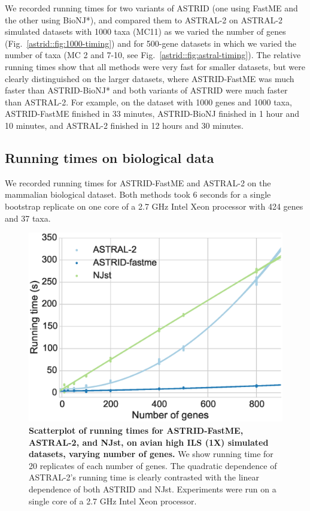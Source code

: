We recorded running times for two variants of ASTRID
(one using FastME and the other using BioNJ*), and compared them
to ASTRAL-2 on ASTRAL-2 simulated datasets  with
1000 taxa (MC11) as we varied the number of genes
(Fig.~\ref{astrid::fig:1000-timing}) and for 500-gene datasets
in which we varied the number of taxa (MC 2 and 7-10, see Fig.~\ref{astrid::fig:astral-timing}).
The relative running times show that all methods were
very fast for smaller datasets, but were clearly distinguished
on the larger datasets, where 
ASTRID-FastME was much faster than ASTRID-BioNJ* and 
both variants of 
ASTRID were much faster than ASTRAL-2.  
For example, on the dataset with 1000
genes and 1000 taxa, ASTRID-FastME
finished in 33 minutes, ASTRID-BioNJ finished in 1 hour and 10
minutes, and ASTRAL-2 finished in 12 hours and 30 minutes.


\subsection{Running times on biological data}
We recorded running times for ASTRID-FastME and ASTRAL-2 on the
mammalian biological dataset. Both methods took 6 seconds for a
single bootstrap replicate on one core of a 2.7 GHz Intel Xeon
processor with 424 genes and 37 taxa. 
 
\begin{figure}
  \centering
  \includegraphics[width=12cm]{astrid-figs/avian-timing.eps}
  \caption[Running times for
ASTRID-FastME, ASTRAL-2, and NJst,  on avian high ILS
(1X) simulated datasets]{\textbf{Scatterplot of running times for
ASTRID-FastME, ASTRAL-2, and NJst,  on avian high ILS
(1X) simulated datasets, varying number
    of genes.} We show running time for 20 replicates of each
number of genes.    The quadratic dependence of ASTRAL-2's 
 running time is
    clearly contrasted with the linear
dependence of both ASTRID and NJst. 
    Experiments were run on a single core of a
    2.7 GHz Intel Xeon processor.}
  \label{astrid::fig:avian-timing}
\end{figure}


